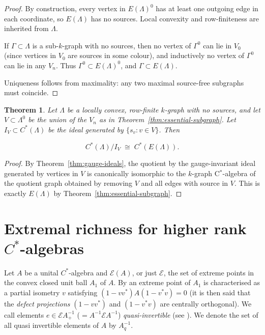 \documentclass[12pt]{amsart}
\newcommand{\Ee}{\mathcal{E}}
\theoremstyle{plain}
\newtheorem{theorem}{Theorem}[section]
\theoremstyle{definition}
\theoremstyle{remark}
\begin{document}
\begin{proof}
By construction, every vertex in $E(\Lambda)^0$ has at least one outgoing edge in each
coordinate, so $E(\Lambda)$ has no sources. Local convexity and row-finiteness are inherited
from $\Lambda$.

If $\Gamma\subset\Lambda$ is a sub-$k$-graph with no sources, then no vertex of $\Gamma^0$
can lie in $V_0$ (since vertices in $V_0$ are sources in some colour), and inductively no
vertex of $\Gamma^0$ can lie in any $V_n$. Thus $\Gamma^0\subset E(\Lambda)^0$, and
$\Gamma\subset E(\Lambda)$.

Uniqueness follows from maximality: any two maximal source-free subgraphs must coincide.
\end{proof}


\begin{theorem}\label{thm:quotient-sources}
Let $\Lambda$ be a locally convex, row-finite $k$-graph with no sources, and let
$V\subset\Lambda^0$ be the union of the $V_n$ as in Theorem~\ref{thm:essential-subgraph}.
Let $I_V\subset C^*(\Lambda)$ be the ideal generated by $\{s_v : v\in V\}$. Then


\[
C^*(\Lambda)/I_V \;\cong\; C^*(E(\Lambda)).
\]


\end{theorem}

\begin{proof}
By Theorem~\ref{thm:gauge-ideals}, the quotient by the gauge-invariant ideal generated
by vertices in $V$ is canonically isomorphic to the $k$-graph C$^*$-algebra of the
quotient graph obtained by removing $V$ and all edges with source in $V$. This is
exactly $E(\Lambda)$ by Theorem~\ref{thm:essential-subgraph}.
\end{proof}

\section{Extremal richness for higher rank $C^*$-algebras}\label{sec:extreme}

Let $A$ be a unital $C^*$-algebra and $\Ee (A)$, or just $\Ee$, the set of extreme points in the convex closed unit ball $A_1$ of $A$. By \cite[Proposition 1.4.7]{Ped} an extreme point of $A_1$ is characterised as a partial isometry $v$ satisfying $( 1 - v v^* ) A ( 1 - v^* v ) = 0$ (it is then said that the \emph{defect projections} $( 1 - v v^* ) $ and $( 1 - v^* v )$ are centrally orthogonal). We call elements $e \in \Ee A_+^{-1}$ ($=A^{-1}\Ee A^{-1}$) \emph{quasi-invertible} (see \cite{BP,Pe0,BP2}). We denote the set of all quasi invertible elements of $A$ by $A_q^{-1}$.
\end{document}
